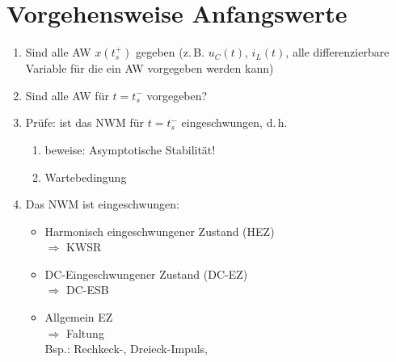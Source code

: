 
\section{Vorgehensweise Anfangswerte}

\begin{enumerate}
  \item Sind alle AW $x(t_s^+)$ gegeben
    (z.\,B. $u_C(t)$, $i_L(t)$, alle differenzierbare Variable
    für die ein AW vorgegeben werden kann)
  \item Sind alle AW für $t=t_s^-$ vorgegeben?
  \item Prüfe: ist das NWM für $t=t_s^-$ eingeschwungen, d.\,h.
    \begin{enumerate}
      \item beweise: Asymptotische Stabilität!
      \item Wartebedingung
    \end{enumerate}
  \item Das NWM ist eingeschwungen:
    \begin{itemize}
      \item Harmonisch eingeschwungener Zustand (HEZ)\\
        $\Rightarrow$ KWSR
      \item DC-Eingeschwungener Zustand (DC-EZ)\\
        $\Rightarrow$ DC-ESB
      \item Allgemein EZ\\
        $\Rightarrow$ Faltung\\
        Bsp.: Rechkeck-, Dreieck-Impuls,
    \end{itemize}
\end{enumerate}



